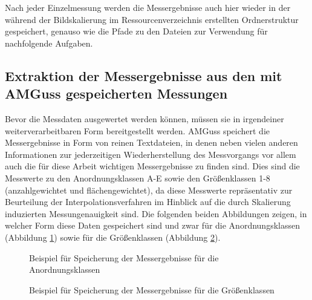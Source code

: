 \documentclass[
fontsize=10pt, 
listof = totoc,
parskip = half	
]{report}
\begin{document}
\noindent Nach jeder Einzelmessung werden die Messergebnisse auch hier wieder in der während der Bildskalierung im Ressourcenverzeichnis erstellten Ordnerstruktur gespeichert, genauso wie die Pfade zu den Dateien zur Verwendung für nachfolgende Aufgaben.

\subsection{Extraktion der Messergebnisse aus den mit AMGuss gespeicherten Messungen}
\label{subsec:FlowExtraktionMessergebnisse}

Bevor die Messdaten ausgewertet werden können, müssen sie in irgendeiner weiterverarbeitbaren Form bereitgestellt werden. AMGuss speichert die Messergebnisse in Form von reinen Textdateien, in denen neben vielen anderen Informationen zur jederzeitigen Wiederherstellung des Messvorgangs vor allem auch die für diese Arbeit wichtigen Messergebnisse zu finden sind. Dies sind die Messwerte zu den Anordnungsklassen A-E sowie den Größenklassen 1-8 (anzahlgewichtet und flächengewichtet), da diese Messwerte repräsentativ zur Beurteilung der Interpolationsverfahren im Hinblick auf die durch Skalierung induzierten Messungenauigkeit sind. Die folgenden beiden Abbildungen zeigen, in welcher Form diese Daten gespeichert sind und zwar für die Anordnungsklassen (Abbildung \ref{fig:KlassifikationsergebnisseAkl}) sowie für die Größenklassen (Abbildung \ref{fig:KlassifikationsergebnisseGK}).

\begin{figure}[H]
	\centering
	\caption{Beispiel für Speicherung der Messergebnisse für die Anordnungsklassen}
	\label{fig:KlassifikationsergebnisseAkl}
\end{figure}

\begin{figure}[H]
	\centering
	\caption{Beispiel für Speicherung der Messergebnisse für die Größenklassen}
	\label{fig:KlassifikationsergebnisseGK}
\end{figure}
\end{document}

